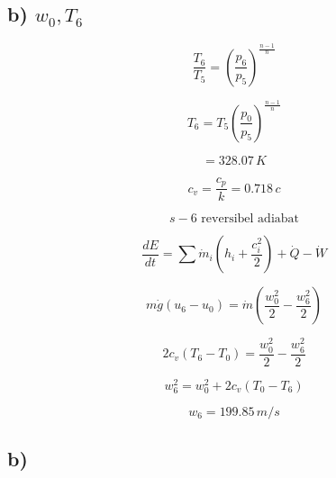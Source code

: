\subsection*{b) $w_0, T_6$}

\begin{equation*}
    \frac{T_6}{T_5} = \left( \frac{p_6}{p_5} \right)^{\frac{n-1}{n}}
\end{equation*}

\begin{equation*}
    T_6 = T_5 \left( \frac{p_0}{p_5} \right)^{\frac{n-1}{n}}
\end{equation*}

\begin{equation*}
    = 328.07 \, K
\end{equation*}

\begin{equation*}
    c_v = \frac{c_p}{k} = 0.718 \, c
\end{equation*}

\begin{equation*}
    s-6 \text{ reversibel adiabat}
\end{equation*}

\begin{equation*}
    \frac{dE}{dt} = \sum \dot{m}_i (h_i + \frac{c_i^2}{2}) + \dot{Q} - \dot{W}
\end{equation*}

\begin{equation*}
    m \dot{g} (u_6 - u_0) = \dot{m} \left( \frac{w_0^2}{2} - \frac{w_6^2}{2} \right)
\end{equation*}

\begin{equation*}
    2 c_v (T_6 - T_0) = \frac{w_0^2}{2} - \frac{w_6^2}{2}
\end{equation*}

\begin{equation*}
    w_6^2 = w_0^2 + 2 c_v (T_0 - T_6)
\end{equation*}

\begin{equation*}
    w_6 = 199.85 \, m/s
\end{equation*}



\subsection*{b)}

